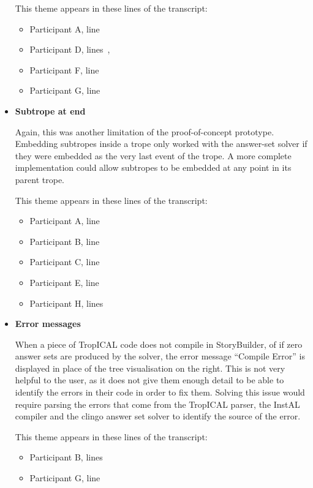 \documentclass[11pt]{report}
\begin{document}
\begin{itemize}
This theme appears in these lines of the transcript:

\begin{itemize}
\item Participant A, line~
\item Participant D, lines~,~
\item Participant F, line~
\item Participant G, line~
\end{itemize}

\item \textbf{Subtrope at end}

Again, this was another limitation of the proof-of-concept prototype. Embedding
subtropes inside a trope only worked with the answer-set solver if they were
embedded as the very last event of the trope. A more complete implementation
could allow subtropes to be embedded at any point in its parent trope.

This theme appears in these lines of the transcript:
  
\begin{itemize}
\item Participant A, line~
\item Participant B, line~
\item Participant C, line~
\item Participant E, line~
\item Participant H, lines~
\end{itemize}

\item \textbf{Error messages}

When a piece of TropICAL code does not compile in StoryBuilder, of if zero
answer sets are produced by the solver, the error message ``Compile Error''
is displayed in place of the tree visualisation on the right. This is not very
helpful to the user, as it does not give them enough detail to be able to
identify the errors in their code in order to fix them. Solving this issue would
require parsing the errors that come from the TropICAL parser, the InstAL
compiler and the clingo answer set solver to identify the source of the error.

This theme appears in these lines of the transcript:

\begin{itemize}
\item Participant B, lines~
\item Participant G, line~
\end{itemize}
\end{itemize}
\end{document}
